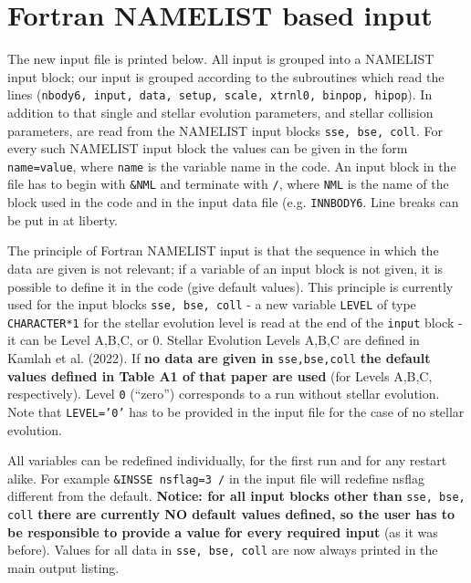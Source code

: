 \section*{Fortran NAMELIST based input}

The new input file is printed below. All input is grouped into a NAMELIST input block; our input is grouped according to the subroutines which read the lines ({\tt nbody6, input, data, setup, scale, xtrnl0, binpop, hipop}). In addition to that single and stellar evolution parameters, and stellar collision parameters, are read from the NAMELIST input blocks {\tt sse, bse, coll}. For every such NAMELIST input block the values can be given in the form {\tt name=value}, where {\tt name} is the variable name in the code. An input block in the file has to begin with {\tt \&NML} and terminate with {\tt /}, where {\tt NML} is the name of the block used in the code and in the input data file (e.g. {\tt INNBODY6}. Line breaks can be put in at liberty.

The principle of Fortran NAMELIST input is that the sequence in which the data are given is not relevant; if a variable of an input block is not given, it is possible to define it in the code (give default values). This principle is currently used for the input blocks {\tt sse, bse, coll} - a new variable {\tt LEVEL} of type {\tt CHARACTER*1} for the stellar evolution level is read at the end of the {\tt input} block - it can be Level A,B,C, or 0. Stellar Evolution Levels A,B,C are defined in Kamlah et al. (2022). If {\bf no data are given in} {\tt sse,bse,coll} {\bf the default values defined in Table A1 of that paper are used} (for Levels A,B,C, respectively). Level {\tt 0} (``zero'') corresponds to a run without stellar evolution. Note that {\tt LEVEL='0'} has to be provided in the input file for the case of no stellar evolution.

All variables can be redefined individually, for the first run and for any restart alike. For example
{\tt \&INSSE nsflag=3 /} in the input file will redefine nsflag different from the default. {\bf Notice: for all input blocks other than} {\tt sse, bse, coll} {\bf there are currently NO default values defined, so the user has to be responsible to provide a value for every required input} (as it was before). Values for all data in {\tt sse, bse, coll} are now always printed in the main output listing.


